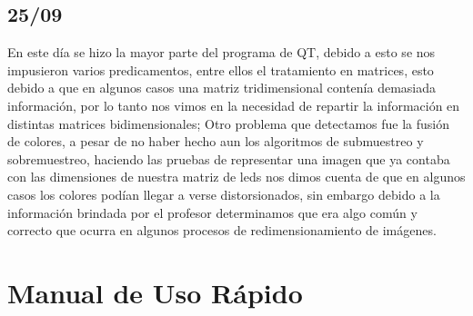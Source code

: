 \documentclass{article}
\begin{document}
    \begin{flushleft}
     \subsection{25/09}
     En este día se hizo la mayor parte del programa de QT, debido a esto se nos impusieron varios predicamentos, entre ellos el tratamiento en matrices, esto debido a que en algunos casos una matriz tridimensional contenía demasiada información, por lo tanto nos vimos en la necesidad de repartir la información en distintas matrices bidimensionales; Otro problema que detectamos fue la fusión de colores, a pesar de no haber hecho aun los algoritmos de submuestreo y sobremuestreo, haciendo las pruebas de representar una imagen que ya contaba con las dimensiones de nuestra matriz de leds nos dimos cuenta de que en algunos casos los colores podían llegar a verse distorsionados, sin embargo debido a la información brindada por el profesor determinamos que era algo común y correcto que ocurra en algunos procesos de redimensionamiento de imágenes.
    \end{flushleft}

    
\section{Manual de Uso Rápido}
\label{manual}
    \begin{flushleft}
        
    \end{flushleft}

\vfill

\end{document}
